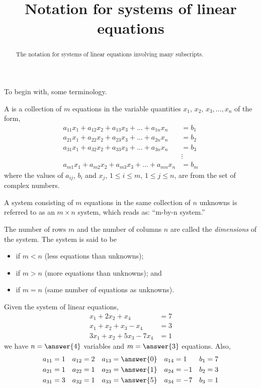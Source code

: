 \documentclass{ximera}
\title{Notation for systems of linear equations}
\begin{document}
\begin{abstract}
  The notation for systems of linear equations involving many subscripts.
\end{abstract}
\maketitle

To begin with, some terminology. 

\begin{definition}
  A  is a collection of $m$ equations
  in the variable quantities $x_1,\,x_2,\,x_3,\ldots,x_n$ of the form,
  \begin{align*}
    a_{11}x_1+a_{12}x_2+a_{13}x_3+\dots+a_{1n}x_n&=b_1\\
    a_{21}x_1+a_{22}x_2+a_{23}x_3+\dots+a_{2n}x_n&=b_2\\
    a_{31}x_1+a_{32}x_2+a_{33}x_3+\dots+a_{3n}x_n&=b_3\\
                                                 &\vdots\\
    a_{m1}x_1+a_{m2}x_2+a_{m3}x_3+\dots+a_{mn}x_n&=b_m
  \end{align*}
  where the values of $a_{ij}$, $b_i$ and $x_j$, $1\leq i\leq m$,
  $1\leq j\leq n$, are from the set of complex numbers.

  A system consisting of $m$ equations in the same collection of $n$
  unknowns is referred to as an $m\times n$ system, which reads as:
  ``m-by-n system.''
\end{definition}

The number of rows $m$ and the number of columns $n$ are called the {\it dimensions} of the system. The system is said to be
\begin{itemize}
\item {} if $m < n$ (less equations than unknowns);
\item {} if $m > n$ (more equations than unknowns); and
\item {} if $m = n$ (same number of equations as unknowns).
\end{itemize}

\begin{example}
  Given the system of linear equations,
  \begin{align*}
    x_1+2x_2 + x_4&= 7\\
    x_1+x_2+x_3-x_4&=3\\
    3x_1+x_2+5x_3-7x_4&=1
  \end{align*}
  we have $n=\answer{4}$ variables and $m=\answer{3}$ equations.  Also,
  \begin{align*}
    a_{11}&=1 & a_{12}&=2 & a_{13}&=\answer{0} & a_{14}&=1 & b_{1}&=7\\
    a_{21}&=1 & a_{22}&=1 & a_{23}&=\answer{1} & a_{24}&=-1 & b_{2}&=3\\
    a_{31}&=3 & a_{32}&=1 & a_{33}&=\answer{5} & a_{34}&=-7 & b_{3}&=1
  \end{align*}
\end{example}
\end{document}

